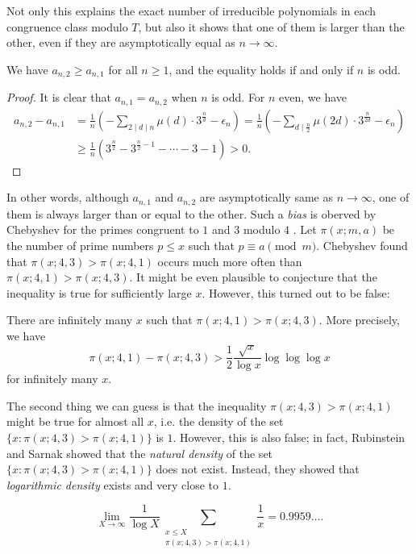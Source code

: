 Not only this explains the exact number of irreducible polynomials in each congruence class modulo $T$, but also it shows that one of them is larger than the other, even if they are asymptotically equal as $n \to \infty$.
\begin{corollary}
    We have $a_{n,2} \ge a_{n,1}$ for all $n \ge 1$, and the equality holds if and only if $n$ is odd.
\end{corollary}
\begin{proof}
    It is clear that $a_{n,1} = a_{n,2}$ when $n$ is odd.
    For $n$ even, we have
    \begin{align*}
    a_{n,2} - a_{n,1} &= \frac{1}{n} \left(- \sum_{2 \mid d \mid n} \mu(d)\cdot 3^{\frac{n}{d}} - \epsilon_n\right) = \frac{1}{n} \left(-\sum_{d \mid \frac{n}{2}} \mu(2d) \cdot 3^{\frac{n}{2d}} - \epsilon_n\right) \\
    &\ge \frac{1}{n} \left(3^{\frac{n}{2}} - 3^{\frac{n}{2} - 1} - \cdots - 3 - 1\right) > 0.
    \end{align*}
\end{proof}

In other words, although $a_{n,1}$ and $a_{n,2}$ are asymptotically same as $n \to \infty$, one of them is always larger than or equal to the other.
Such a \emph{bias} is oberved by Chebyshev for the primes congruent to $1$ and $3$ modulo $4$ \cite{chebyshev1853lettre}.
Let $\pi(x;m,a)$ be the number of prime numbers $p \le x$ such that $p \equiv a \pmod{m}$.
Chebyshev found that $\pi(x;4, 3) > \pi(x;4,1)$ occurs much more often than $\pi(x;4,1) > \pi(x;4,3)$.
It might be even plausible to conjecture that the inequality is true for sufficiently large $x$.
However, this turned out to be false:
\begin{theorem}
    There are infinitely many $x$ such that $\pi(x;4,1) > \pi(x;4,3)$.
    More precisely, we have
    \[
    \pi(x;4,1) - \pi(x;4,3) > \frac{1}{2} \frac{\sqrt{x}}{\log x} \log \log \log x
    \]
    for infinitely many $x$.
\end{theorem}

The second thing we can guess is that the inequality $\pi(x;4,3) > \pi(x;4,1)$ might be true for almost all $x$, i.e. the density of the set $\{x : \pi(x;4,3) > \pi(x;4,1)\}$ is $1$.
However, this is also false; in fact, Rubinstein and Sarnak \cite{rubinstein1994chebyshev} showed that the \emph{natural density} of the set $\{x : \pi(x;4,3) > \pi(x;4,1)\}$ does not exist.
Instead, they showed that \emph{logarithmic density} exists and very close to $1$.
\begin{theorem}
    \[
    \lim_{X \to \infty} \frac{1}{\log X} \sum_{\substack{x \le X \\ \pi(x;4,3) > \pi(x;4,1)}} \frac{1}{x} = 0.9959\dots.
    \]
\end{theorem}

